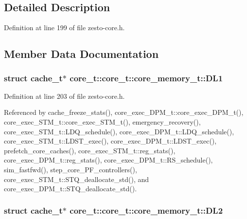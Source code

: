 \subsection{Detailed Description}


Definition at line 199 of file zesto-core.h.

\subsection{Member Data Documentation}
\subsubsection[{DL1}]{\setlength{\rightskip}{0pt plus 5cm}struct {\bf cache\_\-t}$\ast$ core\_\-t::core\_\-t::core\_\-memory\_\-t::DL1\hspace{0.3cm}{\tt  [read]}}\label{structcore__t_1_1core__memory__t_5a91d2a6ce0026324cafd070c12d4b42}




Definition at line 203 of file zesto-core.h.

Referenced by cache\_\-freeze\_\-stats(), core\_\-exec\_\-DPM\_\-t::core\_\-exec\_\-DPM\_\-t(), core\_\-exec\_\-STM\_\-t::core\_\-exec\_\-STM\_\-t(), emergency\_\-recovery(), core\_\-exec\_\-STM\_\-t::LDQ\_\-schedule(), core\_\-exec\_\-DPM\_\-t::LDQ\_\-schedule(), core\_\-exec\_\-STM\_\-t::LDST\_\-exec(), core\_\-exec\_\-DPM\_\-t::LDST\_\-exec(), prefetch\_\-core\_\-caches(), core\_\-exec\_\-STM\_\-t::reg\_\-stats(), core\_\-exec\_\-DPM\_\-t::reg\_\-stats(), core\_\-exec\_\-DPM\_\-t::RS\_\-schedule(), sim\_\-fastfwd(), step\_\-core\_\-PF\_\-controllers(), core\_\-exec\_\-STM\_\-t::STQ\_\-deallocate\_\-std(), and core\_\-exec\_\-DPM\_\-t::STQ\_\-deallocate\_\-std().
\subsubsection[{DL2}]{\setlength{\rightskip}{0pt plus 5cm}struct {\bf cache\_\-t}$\ast$ core\_\-t::core\_\-t::core\_\-memory\_\-t::DL2\hspace{0.3cm}{\tt  [read]}}\label{structcore__t_1_1core__memory__t_9b342dd887c9993db9a797f69ead9dd8}




